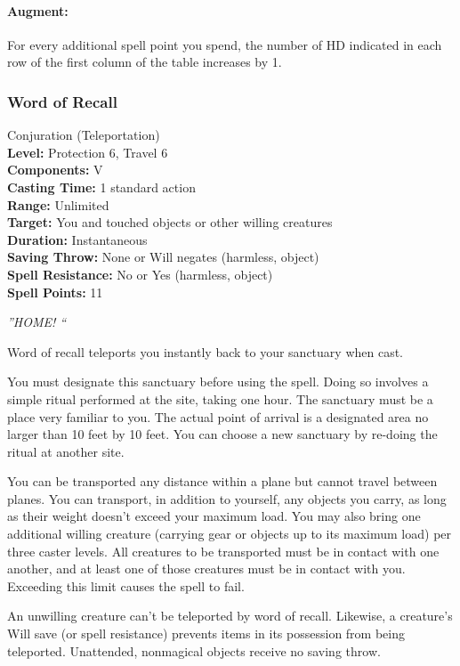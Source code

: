\paragraph{Augment:} For every additional spell point you spend, the number of HD indicated in each row of the first column of the  table increases by 1.
\subsubsection{Word of Recall}
\label{Spell:WordOfRecall}
Conjuration (Teleportation)
\\ \textbf{Level:} Protection 6, Travel 6
\\ \textbf{Components:} V
\\ \textbf{Casting Time:} 1 standard action
\\ \textbf{Range:} Unlimited
\\ \textbf{Target:} You and touched objects or other willing creatures
\\ \textbf{Duration:} Instantaneous
\\ \textbf{Saving Throw:} None or Will negates (harmless, object)
\\ \textbf{Spell Resistance:} No or Yes (harmless, object)
\\ \textbf{Spell Points:} 11

\emph{''HOME! ``}

Word of recall teleports you instantly back to your sanctuary when cast. 

You must designate this sanctuary before using the spell.
Doing so involves a simple ritual performed at the site, taking one hour. 
The sanctuary must be a place very familiar to you. 
The actual point of arrival is a designated area no larger than 10 feet by 10 feet.
You can choose a new sanctuary by re-doing the ritual at another site.

You can be transported any distance within a plane but cannot travel between planes. 
You can transport, in addition to yourself, any objects you carry, as long as their weight doesn't exceed your maximum load. 
You may also bring one additional willing creature (carrying gear or objects up to its maximum load) per three caster levels. 
All creatures to be transported must be in contact with one another, and at least one of those creatures must be in contact with you. Exceeding this limit causes the spell to fail.

An unwilling creature can't be teleported by word of recall. Likewise, a creature's Will save (or spell resistance) prevents items in its possession from being teleported. Unattended, nonmagical objects receive no saving throw.

